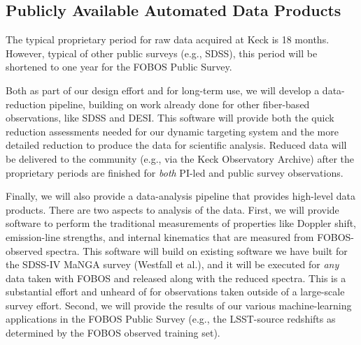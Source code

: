 \documentclass[oneside,11pt]{amsart}
\newcommand{\comment}[2][todo]{{\color{#1}[[{\bf #2}]]}}
\begin{document}


\subsection{Publicly Available Automated Data Products}
\label{sec:DAP}

The typical proprietary period for raw data acquired at Keck is 18
months.  However, typical of other public surveys (e.g., SDSS), this
period will be shortened to one year for the FOBOS Public Survey.

Both as part of our design effort and for long-term use, we will develop
a data-reduction pipeline, building on work already done for other
fiber-based observations, like SDSS and DESI.  This software will
provide both the quick reduction assessments needed for our dynamic
targeting system and the more detailed reduction to produce the data for
scientific analysis.  Reduced data will be delivered to the community
(e.g., via the Keck Observatory Archive) after the proprietary periods
are finished for {\it both} PI-led and public survey observations.

Finally, we will also provide a data-analysis pipeline that provides
high-level data products.  There are two aspects to analysis of the
data.  First, we will provide software to perform the traditional
measurements of properties like Doppler shift, emission-line strengths,
and internal kinematics that are measured from FOBOS-observed spectra.
This software will build on existing software we have built for the
SDSS-IV MaNGA survey (Westfall et al.), and it will be executed for {\it
any} data taken with FOBOS and released along with the reduced spectra.
This is a substantial effort and unheard of for observations taken
outside of a large-scale survey effort.  Second, we will provide the
results of our various machine-learning applications in the FOBOS Public
Survey (e.g., the LSST-source redshifts as determined by the FOBOS
observed training set).
\end{document}
